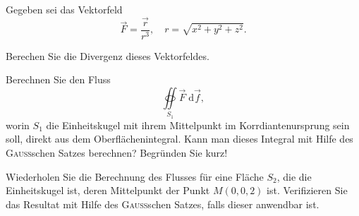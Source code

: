 \begin{atiTask}[
  title = Anwendbarkeit des GAUSSschen Satzes,
]

Gegeben sei das Vektorfeld
\[
\vec{F}=\frac{\vec{r}}{r^3},\quad r=\sqrt{x^2+y^2+z^2}.
\]
\begin{atiSubtasks}
\item Berechen Sie die Divergenz dieses Vektorfeldes.
\item Berechnen Sie den Fluss
\[\oiint\limits_{S_1} \vec{F}\;\mathrm{d}\vec{f},
\]
worin $S_1$ die Einheitskugel mit ihrem Mittelpunkt im Korrdiantenursprung sein soll, direkt aus dem Oberflächenintegral. Kann man dieses Integral mit Hilfe des \textsc{Gauss}schen Satzes berechnen? Begründen Sie kurz!
\item Wiederholen Sie die Berechnung des Flusses für eine Fläche $S_2$, die die Einheitskugel ist, deren Mittelpunkt der Punkt $M(0,0,2)$ ist. Verifizieren Sie das Resultat mit Hilfe des \textsc{Gauss}schen Satzes, falls dieser anwendbar ist.
\end{atiSubtasks}

\end{atiTask}

\begin{atiSolution}

\end{atiSolution}